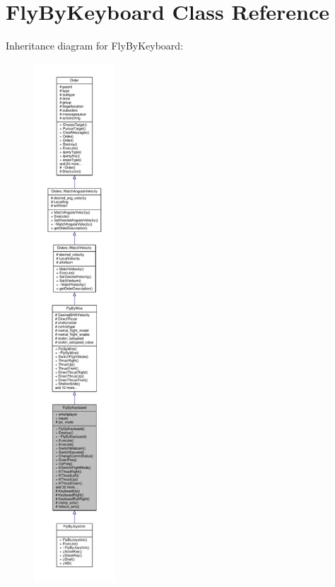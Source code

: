 \hypertarget{classFlyByKeyboard}{}\section{Fly\+By\+Keyboard Class Reference}
\label{classFlyByKeyboard}


Inheritance diagram for Fly\+By\+Keyboard\+:
\nopagebreak
\begin{figure}[H]
\begin{center}
\leavevmode
\includegraphics[height=550pt]{d1/df6/classFlyByKeyboard__inherit__graph}
\end{center}
\end{figure}


